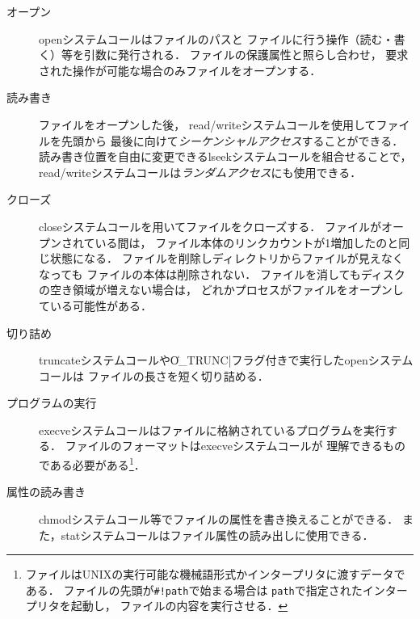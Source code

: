 \begin{description}
\item[オープン]
  openシステムコールはファイルのパスと
  ファイルに行う操作（読む・書く）等を引数に発行される．
  ファイルの保護属性と照らし合わせ，
  要求された操作が可能な場合のみファイルをオープンする．
\item[読み書き]
  ファイルをオープンした後，
  read/writeシステムコールを使用してファイルを先頭から
  最後に向けて\emph{シーケンシャルアクセス}することができる．
  読み書き位置を自由に変更できるlseekシステムコールを組合せることで，
  read/writeシステムコールは\emph{ランダムアクセス}にも使用できる．
\item[クローズ]
  closeシステムコールを用いてファイルをクローズする．
  ファイルがオープンされている間は，
  ファイル本体のリンクカウントが1増加したのと同じ状態になる．
  ファイルを削除しディレクトリからファイルが見えなくなっても
  ファイルの本体は削除されない．
  ファイルを消してもディスクの空き領域が増えない場合は，
  どれかプロセスがファイルをオープンしている可能性がある．
\item[切り詰め]
  truncateシステムコールや\|O_TRUNC|フラグ付きで実行したopenシステムコールは
  ファイルの長さを短く切り詰める．
\item[プログラムの実行]
  execveシステムコールはファイルに格納されているプログラムを実行する．
  ファイルのフォーマットはexecveシステムコールが
  理解できるものである必要がある\footnote{
    ファイルはUNIXの実行可能な機械語形式かインタープリタに渡すデータである．
    ファイルの先頭が\texttt{\#!path}で始まる場合は
    \texttt{path}で指定されたインタープリタを起動し，
    ファイルの内容を実行させる．
  }．
\item[属性の読み書き]
  chmodシステムコール等でファイルの属性を書き換えることができる．
  また，statシステムコールはファイル属性の読み出しに使用できる．
\end{description}

